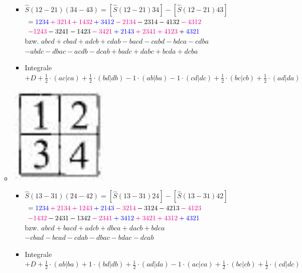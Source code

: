 \documentclass[12pt,a4paper]{article}
\newcommand{\h}[2]{\color{#1} #2 \color{black} }
\newcommand{\equalInM}[1]{\h{blue}{#1}} %
\newcommand{\equalInTableau}[1]{\h{magenta}{#1}} %
\begin{document}
\begin{itemize}
\begin{itemize}
\begin{itemize}
\item $\hat{S} (12- 21) (34 - 43) = \left[ \hat{S} (12-21) 34 \right] - \left[ \hat{S} (12 - 21)43\right]$ \\ 
$ = \equalInM{1234} \equalInTableau{+ 3214} \equalInTableau{+ 1432} \equalInM{+ 3412 }
\equalInTableau{- 2134 } - 2314 - 4132 \equalInTableau{- 4312 } $\\
$\equalInTableau{- 1243 } - 3241 - 1423 \equalInTableau{- 3421 }
\equalInM{+ 2143} \equalInTableau{ + 2341 } \equalInTableau{+ 4123} + \equalInM{4321}$ \\
bzw. $abcd + cbad + adcb + cdab - bacd - cabd - bdca - cdba$\\$
-abdc - dbac - acdb - dcab + badc + dabc + bcda + dcba$
\item Integrale \\
$+ D + \frac{1}{2} \cdot (ac|ca) + \frac{1}{2} \cdot (bd|db) - 1 \cdot (ab|ba) - 1 \cdot (cd|dc) + \frac{1}{2} \cdot (bc|cb) + \frac{1}{2} \cdot (ad|da) $
\end{itemize}
\item \includegraphics[scale=0.2]{build/young-2hoch2-12.png}
\begin{itemize}
\item $\hat{S} (13 -31) (24-42) = \left[ \hat{S} (13-31) 24 \right] - \left[ \hat{S} (13-31)42\right]$ \\ 
$= \equalInM{1234} \equalInTableau{+2134} \equalInTableau{+ 1243} \equalInM{+ 2143 }
\equalInTableau{- 3214 } - 3124 -4213 \equalInTableau{- 4123} $\\
$ \equalInTableau{-1432} - 2431 - 1342 \equalInTableau{- 2341}
\equalInM{+ 3412} \equalInTableau{+ 3421} \equalInTableau{+ 4312} \equalInM{+ 4321 }$ \\
bzw. $abcd + bacd + adcb + dbca + dacb + bdca$\\
$-cbad - bcad - cdab - dbac - bdac - dcab$
\item Integrale\\
$ + D + \frac{1}{2} \cdot (ab|ba) + 1 \cdot (bd|db) + \frac{1}{2} \cdot (ad|da) - 1 \cdot (ac|ca) + \frac{1}{2} \cdot (bc|cb) + \frac{1}{2} \cdot (cd|dc)$
\end{itemize}
\end{itemize}


\end{itemize}
\end{document}
